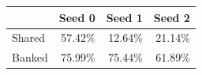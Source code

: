 \begin{tabular}{lrrr}\toprule & Seed 0 & Seed 1 & Seed 2\\\midrule
Shared & 57.42\% & 12.64\% & 21.14\% \\
Banked & 75.99\% & 75.44\% & 61.89\% \\
\bottomrule\end{tabular}
